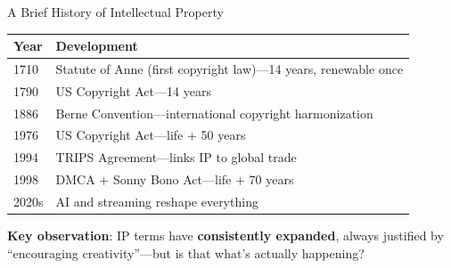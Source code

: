 \documentclass[aspectratio=169]{beamer}
\begin{document}
\begin{frame}{A Brief History of Intellectual Property}
\begin{table}[h]
\centering
\small
\begin{tabular}{l p{9cm}}
\toprule
\textbf{Year} & \textbf{Development} \\
\midrule
1710 & Statute of Anne (first copyright law)---14 years, renewable once \\
1790 & US Copyright Act---14 years \\
1886 & Berne Convention---international copyright harmonization \\
1976 & US Copyright Act---life + 50 years \\
1994 & TRIPS Agreement---links IP to global trade \\
1998 & DMCA + Sonny Bono Act---life + 70 years \\
2020s & AI and streaming reshape everything \\
\bottomrule
\end{tabular}
\end{table}

\vspace{0.2cm}
\textbf{Key observation}: IP terms have \textbf{consistently expanded}, always justified by ``encouraging creativity''---but is that what's actually happening?
\end{frame}
\end{document}
